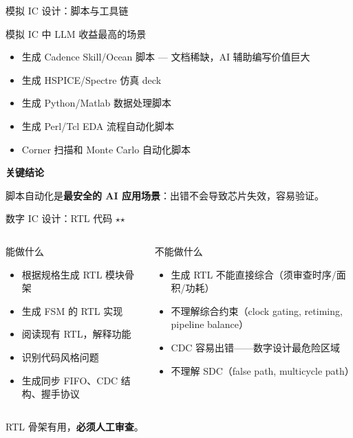 \documentclass[UTF8,11pt,aspectratio=169]{beamer}
\newenvironment{keypoint}{
  \begin{block}{\textbf{关键结论}}
}{
  \end{block}
}
\begin{document}
\begin{frame}{模拟 IC 设计：脚本与工具链 }
  \begin{block}{模拟 IC 中 LLM 收益最高的场景}
    \begin{itemize}
      \item 生成 Cadence Skill/Ocean 脚本 --- 文档稀缺，AI 辅助编写价值巨大
      \item 生成 HSPICE/Spectre 仿真 deck
      \item 生成 Python/Matlab 数据处理脚本
      \item 生成 Perl/Tcl EDA 流程自动化脚本
      \item Corner 扫描和 Monte Carlo 自动化脚本
    \end{itemize}
  \end{block}

  \vspace{0.3em}
  \begin{keypoint}
    脚本自动化是\textbf{最安全的 AI 应用场景}：出错不会导致芯片失效，容易验证。
  \end{keypoint}
\end{frame}

\begin{frame}{数字 IC 设计：RTL 代码 $\star$$\star$}
  \begin{columns}[T]
    \begin{block}{能做什么 }
      \begin{itemize}
        \item 根据规格生成 RTL 模块骨架
        \item 生成 FSM 的 RTL 实现
        \item 阅读现有 RTL，解释功能
        \item 识别代码风格问题
        \item 生成同步 FIFO、CDC 结构、握手协议
      \end{itemize}
    \end{block}

    \begin{alertblock}{不能做什么 }
      \begin{itemize}
        \item 生成 RTL 不能直接综合（须审查时序/面积/功耗）
        \item 不理解综合约束（clock gating, retiming, pipeline balance）
        \item CDC 容易出错------数字设计最危险区域
        \item 不理解 SDC（false path, multicycle path）
      \end{itemize}
    \end{alertblock}
  \end{columns}

  \vspace{0.3em}
  RTL 骨架有用，\textbf{必须人工审查}。
\end{frame}
\end{document}
